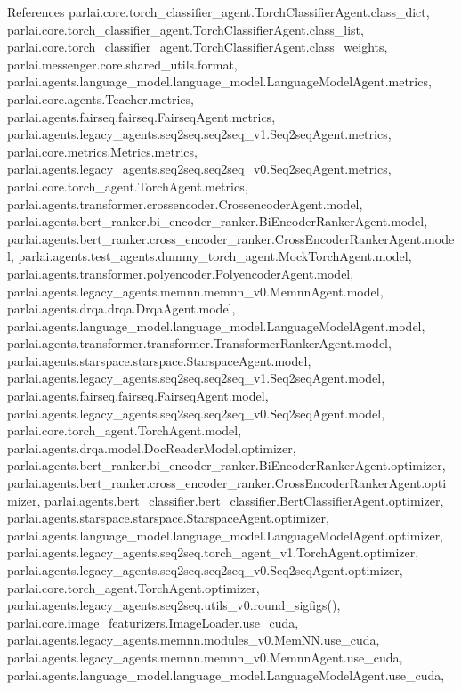 References parlai.\+core.\+torch\+\_\+classifier\+\_\+agent.\+Torch\+Classifier\+Agent.\+class\+\_\+dict, parlai.\+core.\+torch\+\_\+classifier\+\_\+agent.\+Torch\+Classifier\+Agent.\+class\+\_\+list, parlai.\+core.\+torch\+\_\+classifier\+\_\+agent.\+Torch\+Classifier\+Agent.\+class\+\_\+weights, parlai.\+messenger.\+core.\+shared\+\_\+utils.\+format, parlai.\+agents.\+language\+\_\+model.\+language\+\_\+model.\+Language\+Model\+Agent.\+metrics, parlai.\+core.\+agents.\+Teacher.\+metrics, parlai.\+agents.\+fairseq.\+fairseq.\+Fairseq\+Agent.\+metrics, parlai.\+agents.\+legacy\+\_\+agents.\+seq2seq.\+seq2seq\+\_\+v1.\+Seq2seq\+Agent.\+metrics, parlai.\+core.\+metrics.\+Metrics.\+metrics, parlai.\+agents.\+legacy\+\_\+agents.\+seq2seq.\+seq2seq\+\_\+v0.\+Seq2seq\+Agent.\+metrics, parlai.\+core.\+torch\+\_\+agent.\+Torch\+Agent.\+metrics, parlai.\+agents.\+transformer.\+crossencoder.\+Crossencoder\+Agent.\+model, parlai.\+agents.\+bert\+\_\+ranker.\+bi\+\_\+encoder\+\_\+ranker.\+Bi\+Encoder\+Ranker\+Agent.\+model, parlai.\+agents.\+bert\+\_\+ranker.\+cross\+\_\+encoder\+\_\+ranker.\+Cross\+Encoder\+Ranker\+Agent.\+model, parlai.\+agents.\+test\+\_\+agents.\+dummy\+\_\+torch\+\_\+agent.\+Mock\+Torch\+Agent.\+model, parlai.\+agents.\+transformer.\+polyencoder.\+Polyencoder\+Agent.\+model, parlai.\+agents.\+legacy\+\_\+agents.\+memnn.\+memnn\+\_\+v0.\+Memnn\+Agent.\+model, parlai.\+agents.\+drqa.\+drqa.\+Drqa\+Agent.\+model, parlai.\+agents.\+language\+\_\+model.\+language\+\_\+model.\+Language\+Model\+Agent.\+model, parlai.\+agents.\+transformer.\+transformer.\+Transformer\+Ranker\+Agent.\+model, parlai.\+agents.\+starspace.\+starspace.\+Starspace\+Agent.\+model, parlai.\+agents.\+legacy\+\_\+agents.\+seq2seq.\+seq2seq\+\_\+v1.\+Seq2seq\+Agent.\+model, parlai.\+agents.\+fairseq.\+fairseq.\+Fairseq\+Agent.\+model, parlai.\+agents.\+legacy\+\_\+agents.\+seq2seq.\+seq2seq\+\_\+v0.\+Seq2seq\+Agent.\+model, parlai.\+core.\+torch\+\_\+agent.\+Torch\+Agent.\+model, parlai.\+agents.\+drqa.\+model.\+Doc\+Reader\+Model.\+optimizer, parlai.\+agents.\+bert\+\_\+ranker.\+bi\+\_\+encoder\+\_\+ranker.\+Bi\+Encoder\+Ranker\+Agent.\+optimizer, parlai.\+agents.\+bert\+\_\+ranker.\+cross\+\_\+encoder\+\_\+ranker.\+Cross\+Encoder\+Ranker\+Agent.\+optimizer, parlai.\+agents.\+bert\+\_\+classifier.\+bert\+\_\+classifier.\+Bert\+Classifier\+Agent.\+optimizer, parlai.\+agents.\+starspace.\+starspace.\+Starspace\+Agent.\+optimizer, parlai.\+agents.\+language\+\_\+model.\+language\+\_\+model.\+Language\+Model\+Agent.\+optimizer, parlai.\+agents.\+legacy\+\_\+agents.\+seq2seq.\+torch\+\_\+agent\+\_\+v1.\+Torch\+Agent.\+optimizer, parlai.\+agents.\+legacy\+\_\+agents.\+seq2seq.\+seq2seq\+\_\+v0.\+Seq2seq\+Agent.\+optimizer, parlai.\+core.\+torch\+\_\+agent.\+Torch\+Agent.\+optimizer, parlai.\+agents.\+legacy\+\_\+agents.\+seq2seq.\+utils\+\_\+v0.\+round\+\_\+sigfigs(), parlai.\+core.\+image\+\_\+featurizers.\+Image\+Loader.\+use\+\_\+cuda, parlai.\+agents.\+legacy\+\_\+agents.\+memnn.\+modules\+\_\+v0.\+Mem\+N\+N.\+use\+\_\+cuda, parlai.\+agents.\+legacy\+\_\+agents.\+memnn.\+memnn\+\_\+v0.\+Memnn\+Agent.\+use\+\_\+cuda, parlai.\+agents.\+language\+\_\+model.\+language\+\_\+model.\+Language\+Model\+Agent.\+use\+\_\+cuda, 